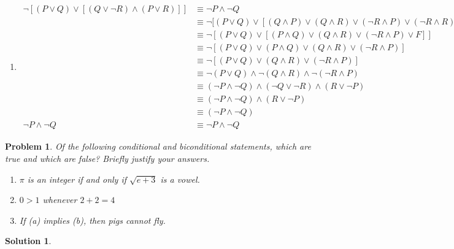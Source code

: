 \documentclass{article}
\newtheorem{problem}{Problem}
\theoremstyle{definition}
\newtheorem*{solution}{Solution}
\begin{document}
\begin{enumerate}[label = \alph*)]
    \item
    \begin{align*}
        \neg [(P \vee Q) \vee [(Q \vee \neg R) \wedge (P \vee R)]] &\equiv \neg P \wedge \neg Q \\
        &\equiv \neg[(P\vee Q) \vee [(Q \wedge P) \vee (Q \wedge R) \vee (\neg R \wedge P) \vee (\neg R \wedge R)] &\text{(Distributive)}\\
        &\equiv \neg[(P \vee Q) \vee [(P \wedge Q) \vee (Q \wedge R) \vee (\neg R \wedge P) \vee F]] &\text{(Commutative, Complement)}\\
        &\equiv \neg [(P \vee Q) \vee (P \wedge Q) \vee (Q \wedge R) \vee (\neg R \wedge P)] &\text{(Associative, Identity)}\\
        &\equiv \neg[(P\vee Q)\vee (Q \wedge R) \vee (\neg R \wedge P)] &\text{(Absorption)}\\
        &\equiv \neg(P\vee Q)\wedge \neg(Q\wedge R)\wedge \neg(\neg R \wedge P) &\text{(DeMorgan's)}\\
        &\equiv (\neg P \wedge \neg Q) \wedge (\neg Q \vee \neg R) \wedge (R \vee \neg P) &\text{(DeMorgan's)}\\
        &\equiv (\neg P \wedge \neg Q) \wedge (R \vee \neg P) &\text{(Idempotent)}\\
        &\equiv (\neg P \wedge \neg Q) &\text{(Idempotent)}\\
        \neg P \wedge \neg Q &\equiv \neg P \wedge \neg Q &\text{(Associative)}
    \end{align*}
\end{enumerate}

\begin{problem}
Of the following conditional and biconditional statements, which are true and which are false? Briefly justify your answers.
\begin{enumerate}[label = \alph*)]
    \item $\pi$ is an integer if and only if $\sqrt{e+3}$ is a vowel.
    
    \item $0>1$ whenever $2+2=4$
    
    \item If (a) implies (b), then pigs cannot fly.
\end{enumerate}
\end{problem}

\begin{solution}
\end{solution}
\end{document}
